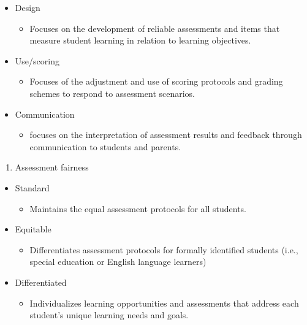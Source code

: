 \documentclass[
]{book}
\providecommand{\tightlist}{%
  \setlength{\itemsep}{0pt}\setlength{\parskip}{0pt}}
\begin{document}
\begin{itemize}
\tightlist
\item
  Design

  \begin{itemize}
  \tightlist
  \item
    Focuses on the development of reliable assessments and items that measure student learning in relation to learning objectives.\\
  \end{itemize}
\item
  Use/scoring

  \begin{itemize}
  \tightlist
  \item
    Focuses of the adjustment and use of scoring protocols and grading schemes to respond to assessment scenarios.\\
  \end{itemize}
\item
  Communication

  \begin{itemize}
  \tightlist
  \item
    focuses on the interpretation of assessment results and feedback through communication to students and parents.\\
  \end{itemize}
\end{itemize}

\begin{enumerate}
\def\labelenumi{\arabic{enumi}.}
\setcounter{enumi}{2}
\tightlist
\item
  Assessment fairness\\
\end{enumerate}

\begin{itemize}
\tightlist
\item
  Standard

  \begin{itemize}
  \tightlist
  \item
    Maintains the equal assessment protocols for all students.\\
  \end{itemize}
\item
  Equitable

  \begin{itemize}
  \tightlist
  \item
    Differentiates assessment protocols for formally identified students (i.e., special education or English language learners)\\
  \end{itemize}
\item
  Differentiated

  \begin{itemize}
  \tightlist
  \item
    Individualizes learning opportunities and assessments that address each student's unique learning needs and goals.\\
  \end{itemize}
\end{itemize}
\end{document}
